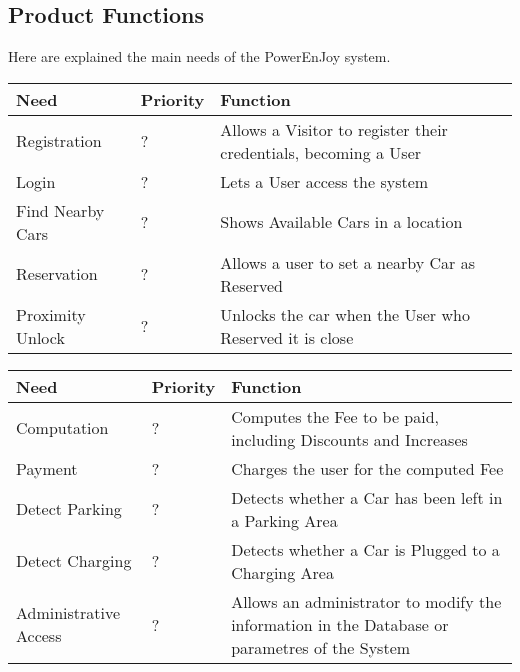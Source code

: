 \subsection{Product Functions}
Here are explained the main needs of the PowerEnJoy system.
\begin{center}
  \begin{tabular}{|p{}|p{}|p{}|}
    \hline
    \textbf{Need} & \textbf{Priority} & \textbf{Function} \\ \hline
    Registration & ? & Allows a Visitor to register their credentials, becoming a User \\ \hline
    Login & ? & Lets a User access the system \\ \hline
    Find Nearby Cars & ? & Shows Available Cars in a location \\ \hline
    Reservation & ? & Allows a user to set a nearby Car as Reserved \\ \hline
    Proximity Unlock & ? & Unlocks the car when the User who Reserved it is close \\ \hline
  \end{tabular}
\end{center}

\begin{center}
  \begin{tabular}{|p{}|p{}|p{}|}
    \hline
    \textbf{Need} & \textbf{Priority} & \textbf{Function} \\ \hline
    Computation & ? & Computes the Fee to be paid, including Discounts and Increases \\ \hline
    Payment & ? & Charges the user for the computed Fee \\ \hline
    Detect Parking & ? & Detects whether a Car has been left in a Parking Area \\ \hline
    Detect Charging & ? & Detects whether a Car is Plugged to a Charging Area \\ \hline
    Administrative Access & ? & Allows an administrator to modify the information in the Database or parametres of the System \\ \hline
  \end{tabular}
\end{center}

